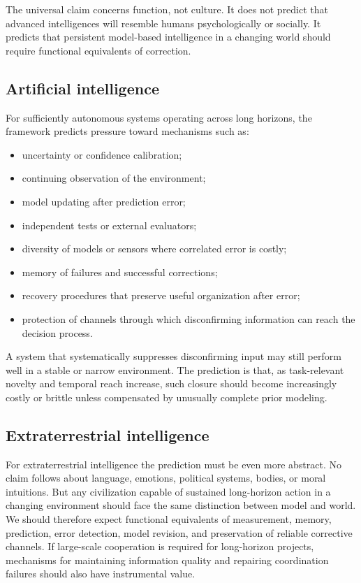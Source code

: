 \documentclass[11pt,a4paper]{article}
\begin{document}
The universal claim concerns function, not culture. It does not predict that advanced intelligences will resemble humans psychologically or socially. It predicts that persistent model-based intelligence in a changing world should require functional equivalents of correction.

\subsection*{Artificial intelligence}
For sufficiently autonomous systems operating across long horizons, the framework predicts pressure toward mechanisms such as:
\begin{itemize}
  \item uncertainty or confidence calibration;
  \item continuing observation of the environment;
  \item model updating after prediction error;
  \item independent tests or external evaluators;
  \item diversity of models or sensors where correlated error is costly;
  \item memory of failures and successful corrections;
  \item recovery procedures that preserve useful organization after error;
  \item protection of channels through which disconfirming information can reach the decision process.
\end{itemize}
A system that systematically suppresses disconfirming input may still perform well in a stable or narrow environment. The prediction is that, as task-relevant novelty and temporal reach increase, such closure should become increasingly costly or brittle unless compensated by unusually complete prior modeling.

\subsection*{Extraterrestrial intelligence}
For extraterrestrial intelligence the prediction must be even more abstract. No claim follows about language, emotions, political systems, bodies, or moral intuitions. But any civilization capable of sustained long-horizon action in a changing environment should face the same distinction between model and world. We should therefore expect functional equivalents of measurement, memory, prediction, error detection, model revision, and preservation of reliable corrective channels. If large-scale cooperation is required for long-horizon projects, mechanisms for maintaining information quality and repairing coordination failures should also have instrumental value.
\end{document}
